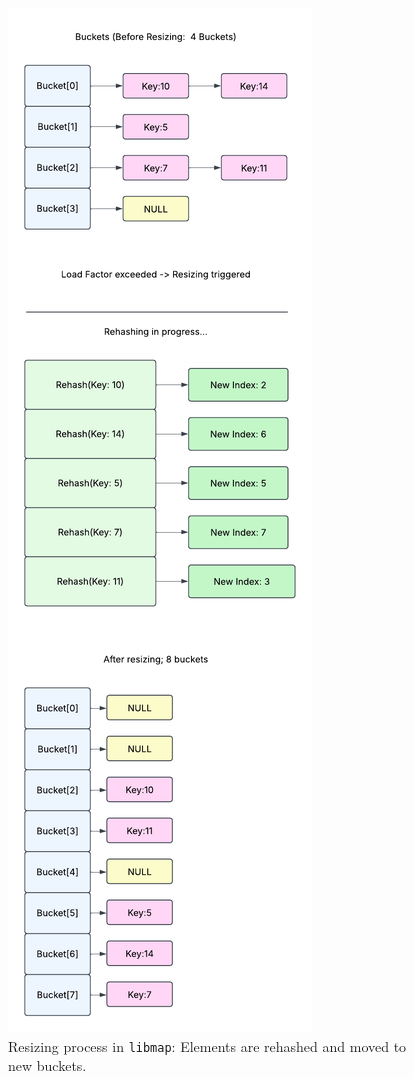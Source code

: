 \documentclass[titlepage]{article}
\begin{document}
\begin{figure}[H]
    \centering
    \includegraphics[height=0.8\textheight]{hashmap_resizing.pdf}
    \caption{Resizing process in \texttt{libmap}: Elements are rehashed and moved to new buckets.}
    \label{fig:resizing}
\end{figure}
\end{document}
